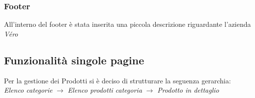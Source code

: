 \documentclass[a4paper, 11pt]{article}
\begin{document}
\subsubsection{Footer}
All'interno del footer è stata inserita una piccola descrizione riguardante l'azienda \textit{Véro}

\subsection{Funzionalità singole pagine}
Per la gestione dei Prodotti si è deciso di strutturare la seguenza gerarchia: \\
\textit{Elenco categorie} $\rightarrow$ \textit{Elenco prodotti categoria} $\rightarrow$  \textit{Prodotto in dettaglio} \\
\end{document}

